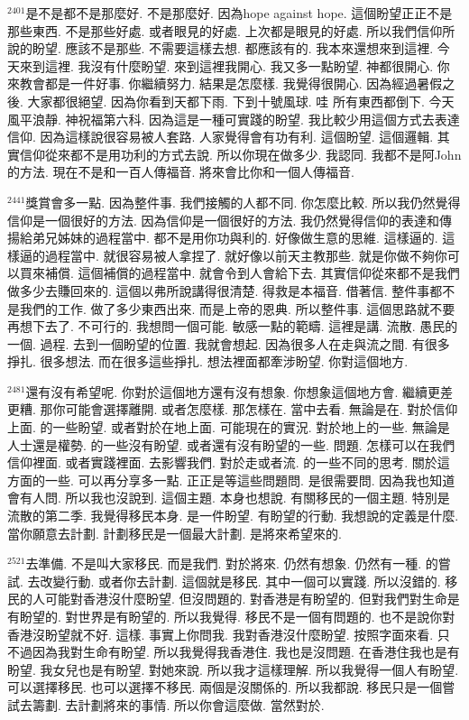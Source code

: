 \documentclass{book}
\begin{document}
$^{2401}$是不是都不是那麼好.
不是那麼好.
因為hope against hope.
這個盼望正正不是那些東西.
不是那些好處.
或者眼見的好處.
上次都是眼見的好處.
所以我們信仰所說的盼望.
應該不是那些.
不需要這樣去想.
都應該有的.
我本來還想來到這裡.
今天來到這裡.
我沒有什麼盼望.
來到這裡我開心.
我又多一點盼望.
神都很開心.
你來教會都是一件好事.
你繼續努力.
結果是怎麼樣.
我覺得很開心.
因為經過暑假之後.
大家都很絕望.
因為你看到天都下雨.
下到十號風球.
哇 所有東西都倒下.
今天風平浪靜.
神祝福第六科.
因為這是一種可實踐的盼望.
我比較少用這個方式去表達信仰.
因為這樣說很容易被人套路.
人家覺得會有功有利.
這個盼望.
這個邏輯.
其實信仰從來都不是用功利的方式去說.
所以你現在做多少.
我認同.
我都不是阿John的方法.
現在不是和一百人傳福音.
將來會比你和一個人傳福音.

$^{2441}$獎賞會多一點.
因為整件事.
我們接觸的人都不同.
你怎麼比較.
所以我仍然覺得信仰是一個很好的方法.
因為信仰是一個很好的方法.
我仍然覺得信仰的表達和傳揚給弟兄姊妹的過程當中.
都不是用你功與利的.
好像做生意的思維.
這樣逼的.
這樣逼的過程當中.
就很容易被人拿捏了.
就好像以前天主教那些.
就是你做不夠你可以買來補償.
這個補償的過程當中.
就會令到人會給下去.
其實信仰從來都不是我們做多少去賺回來的.
這個以弗所說講得很清楚.
得救是本福音.
借著信.
整件事都不是我們的工作.
做了多少東西出來.
而是上帝的恩典.
所以整件事.
這個思路就不要再想下去了.
不可行的.
我想問一個可能.
敏感一點的範疇.
這裡是講.
流散.
愚民的一個.
過程.
去到一個盼望的位置.
我就會想起.
因為很多人在走與流之間.
有很多掙扎.
很多想法.
而在很多這些掙扎.
想法裡面都牽涉盼望.
你對這個地方.

$^{2481}$還有沒有希望呢.
你對於這個地方還有沒有想象.
你想象這個地方會.
繼續更差 更糟.
那你可能會選擇離開.
或者怎麼樣.
那怎樣在.
當中去看.
無論是在.
對於信仰上面.
的一些盼望.
或者對於在地上面.
可能現在的實況.
對於地上的一些.
無論是人士還是權勢.
的一些沒有盼望.
或者還有沒有盼望的一些.
問題.
怎樣可以在我們信仰裡面.
或者實踐裡面.
去影響我們.
對於走或者流.
的一些不同的思考.
關於這方面的一些.
可以再分享多一點.
正正是等這些問題問.
是很需要問.
因為我也知道會有人問.
所以我也沒說到.
這個主題.
本身也想說.
有關移民的一個主題.
特別是流散的第二季.
我覺得移民本身.
是一件盼望.
有盼望的行動.
我想說的定義是什麼.
當你願意去計劃.
計劃移民是一個最大計劃.
是將來希望來的.

$^{2521}$去準備.
不是叫大家移民.
而是我們.
對於將來.
仍然有想象.
仍然有一種.
的嘗試.
去改變行動.
或者你去計劃.
這個就是移民.
其中一個可以實踐.
所以沒錯的.
移民的人可能對香港沒什麼盼望.
但沒問題的.
對香港是有盼望的.
但對我們對生命是有盼望的.
對世界是有盼望的.
所以我覺得.
移民不是一個有問題的.
也不是說你對香港沒盼望就不好.
這樣.
事實上你問我.
我對香港沒什麼盼望.
按照字面來看.
只不過因為我對生命有盼望.
所以我覺得我香港住.
我也是沒問題.
在香港住我也是有盼望.
我女兒也是有盼望.
對她來說.
所以我才這樣理解.
所以我覺得一個人有盼望.
可以選擇移民.
也可以選擇不移民.
兩個是沒關係的.
所以我都說.
移民只是一個嘗試去籌劃.
去計劃將來的事情.
所以你會這麼做.
當然對於.
\end{document}

